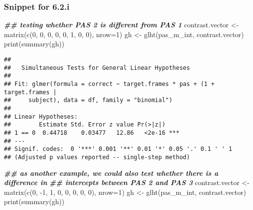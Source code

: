 \documentclass[
]{article}
\newenvironment{Shaded}{\begin{snugshade}}{\end{snugshade}}
\newcommand{\AttributeTok}[1]{\textcolor[rgb]{0.77,0.63,0.00}{#1}}
\newcommand{\DecValTok}[1]{\textcolor[rgb]{0.00,0.00,0.81}{#1}}
\newcommand{\DocumentationTok}[1]{\textcolor[rgb]{0.56,0.35,0.01}{\textbf{\textit{#1}}}}
\newcommand{\FunctionTok}[1]{\textcolor[rgb]{0.00,0.00,0.00}{#1}}
\newcommand{\NormalTok}[1]{#1}
\newcommand{\OtherTok}[1]{\textcolor[rgb]{0.56,0.35,0.01}{#1}}
\newcommand{\SpecialCharTok}[1]{\textcolor[rgb]{0.00,0.00,0.00}{#1}}
\begin{document}
\hypertarget{snippet-for-6.2.i}{%
\subsubsection{Snippet for 6.2.i}\label{snippet-for-6.2.i}}

\begin{Shaded}
\begin{Highlighting}[]
\DocumentationTok{\#\# testing whether PAS 2 is different from PAS 1}
\NormalTok{contrast.vector }\OtherTok{\textless{}{-}} \FunctionTok{matrix}\NormalTok{(}\FunctionTok{c}\NormalTok{(}\DecValTok{0}\NormalTok{, }\DecValTok{0}\NormalTok{, }\DecValTok{0}\NormalTok{, }\DecValTok{0}\NormalTok{, }\DecValTok{0}\NormalTok{, }\DecValTok{1}\NormalTok{, }\DecValTok{0}\NormalTok{, }\DecValTok{0}\NormalTok{), }\AttributeTok{nrow=}\DecValTok{1}\NormalTok{)}
\NormalTok{gh }\OtherTok{\textless{}{-}} \FunctionTok{glht}\NormalTok{(pas\_m\_int, contrast.vector)}
\FunctionTok{print}\NormalTok{(}\FunctionTok{summary}\NormalTok{(gh))}
\end{Highlighting}
\end{Shaded}

\begin{verbatim}
## 
##   Simultaneous Tests for General Linear Hypotheses
## 
## Fit: glmer(formula = correct ~ target.frames * pas + (1 + target.frames | 
##     subject), data = df, family = "binomial")
## 
## Linear Hypotheses:
##        Estimate Std. Error z value Pr(>|z|)    
## 1 == 0  0.44718    0.03477   12.86   <2e-16 ***
## ---
## Signif. codes:  0 '***' 0.001 '**' 0.01 '*' 0.05 '.' 0.1 ' ' 1
## (Adjusted p values reported -- single-step method)
\end{verbatim}

\begin{Shaded}
\begin{Highlighting}[]
\DocumentationTok{\#\# as another example, we could also test whether there is a difference in}
\DocumentationTok{\#\# intercepts between PAS 2 and PAS 3}
\NormalTok{contrast.vector }\OtherTok{\textless{}{-}} \FunctionTok{matrix}\NormalTok{(}\FunctionTok{c}\NormalTok{(}\DecValTok{0}\NormalTok{, }\SpecialCharTok{{-}}\DecValTok{1}\NormalTok{, }\DecValTok{1}\NormalTok{, }\DecValTok{0}\NormalTok{, }\DecValTok{0}\NormalTok{, }\DecValTok{0}\NormalTok{, }\DecValTok{0}\NormalTok{, }\DecValTok{0}\NormalTok{), }\AttributeTok{nrow=}\DecValTok{1}\NormalTok{)}
\NormalTok{gh }\OtherTok{\textless{}{-}} \FunctionTok{glht}\NormalTok{(pas\_m\_int, contrast.vector)}
\FunctionTok{print}\NormalTok{(}\FunctionTok{summary}\NormalTok{(gh))}
\end{Highlighting}
\end{Shaded}
\end{document}
